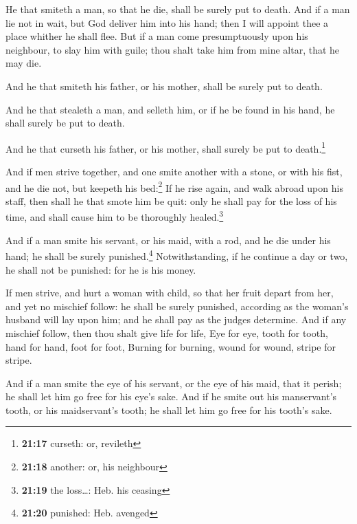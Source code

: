  He that smiteth a man, so that he die, shall be surely
put to death.  And if a man lie not in wait, but God
deliver him into his hand; then I will appoint thee a place whither he
shall flee.  But if a man come presumptuously upon his
neighbour, to slay him with guile; thou shalt take him from mine altar,
that he may die.

 And he that smiteth his father, or his mother, shall be
surely put to death.

 And he that stealeth a man, and selleth him, or if he be
found in his hand, he shall surely be put to death.

 And he that curseth his father, or his mother, shall
surely be put to death.\footnote{\textbf{21:17} curseth: or, revileth}

 And if men strive together, and one smite another with a
stone, or with his fist, and he die not, but keepeth his bed:\footnote{\textbf{21:18}
  another: or, his neighbour}  If he rise again, and walk
abroad upon his staff, then shall he that smote him be quit: only he
shall pay for the loss of his time, and shall cause him to be thoroughly
healed.\footnote{\textbf{21:19} the loss\ldots: Heb. his ceasing}

 And if a man smite his servant, or his maid, with a rod,
and he die under his hand; he shall be surely punished.\footnote{\textbf{21:20}
  punished: Heb. avenged}  Notwithstanding, if he
continue a day or two, he shall not be punished: for he is his money.

 If men strive, and hurt a woman with child, so that her
fruit depart from her, and yet no mischief follow: he shall be surely
punished, according as the woman's husband will lay upon him; and he
shall pay as the judges determine.  And if any mischief
follow, then thou shalt give life for life,  Eye for eye,
tooth for tooth, hand for hand, foot for foot,  Burning
for burning, wound for wound, stripe for stripe.

 And if a man smite the eye of his servant, or the eye of
his maid, that it perish; he shall let him go free for his eye's sake.
 And if he smite out his manservant's tooth, or his
maidservant's tooth; he shall let him go free for his tooth's sake.

